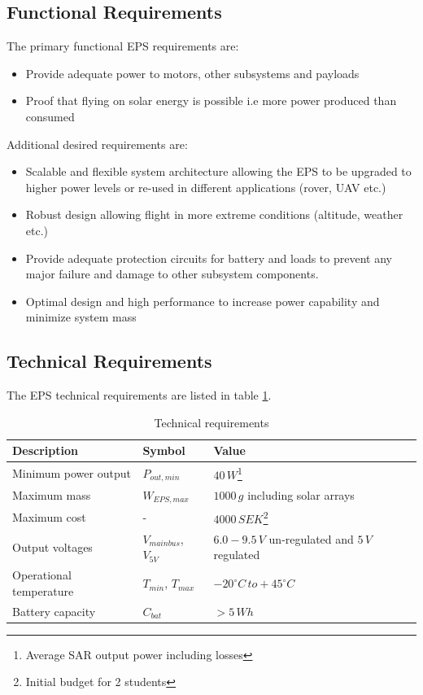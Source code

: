 \subsection{Functional Requirements}
The primary functional \ac{EPS} requirements are:
%
\begin{itemize}
\item Provide adequate power to motors, other subsystems and payloads
\item Proof that flying on solar energy is possible i.e more power produced than consumed
\end{itemize}
%
Additional desired requirements are:
%
\begin{itemize}
\item Scalable and flexible system architecture allowing the \ac{EPS} to be upgraded to higher power levels or re-used in different applications (rover, \ac{UAV} etc.)
\item Robust design allowing flight in more extreme conditions (altitude, weather etc.)
\item Provide adequate protection circuits for battery and loads to prevent any major failure and damage to other subsystem components.
\item Optimal design and high performance to increase power capability and minimize system mass
\end{itemize}
%
\subsection{Technical Requirements}
The \ac{EPS} technical requirements are listed in table \ref{tab:technical_requirements}.
%
\begin{table}[H]
\centering
\caption{Technical requirements}
\label{tab:technical_requirements}
\begin{minipage}{\textwidth}
\begin{tabular}{p{}p{}p{}}
\hline
\textbf{Description} & \textbf{Symbol} & \textbf{Value}\\
\hline
Minimum power output & $P_{out,min}$ & $40\,W$\footnote{Average \ac{SAR} output power including losses}\\
Maximum mass & $W_{EPS,max}$ & $1000\,g$ including solar arrays\\
Maximum cost & - & $4000\,SEK$\footnote{Initial budget for 2 students}\\
Output voltages & $V_{mainbus}$, $V_{5V}$ & $6.0-9.5\,V$ un-regulated and $5\,V$ regulated\\
Operational temperature & $T_{min}$, $T_{max}$ & $-20^{\circ}C\,to +45^{\circ}C$\\
Battery capacity & $C_{bat}$ & $>5\,Wh$\\
\hline
\end{tabular}\par
\vspace{-0.75\skip\footins}
\renewcommand{\footnoterule}{}
\end{minipage}
\end{table}


